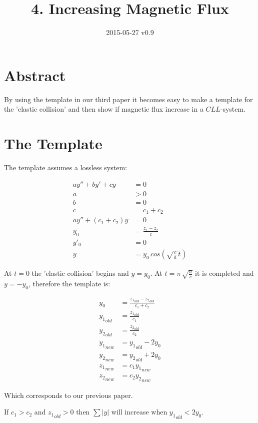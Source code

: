 \documentclass[]{../common/elementary-physics}
\title{4. Increasing Magnetic Flux}
\date{2015-05-27 v0.9}
\begin{document}
\maketitle

\tableofcontents

\section{Abstract}

By using the template in our third paper\cite{analogies} it becomes easy to make a template for the 'elastic collision' and then show if magnetic flux increase in a $CLL$-system.

\section{The Template}

The template assumes a lossless system:

\begin{align}
a y'' + b y' + c y &= 0 \\
a &> 0 \\
b &= 0 \\
c &= c_1 + c_2 \\
a y'' + (c_1 + c_2) y &= 0 \\
y_0 &= \frac{z_1-z_2}{c} \\
y'_0 &= 0 \\
y &= y_0 \, cos(\sqrt{\frac{c}{a} \, t})
\end{align}

At $t=0$ the 'elastic collision' begins and $y=y_0$.
At $t = \pi \, \sqrt{\frac{a}{c}}$ it is completed and $y = -y_0$, therefore the template is:

\begin{align}
y_0 &= \frac{{z_1}_{old}-{z_2}_{old}}{c_1 + c_2} \\
{y_1}_{old} &= \frac{{z_1}_{old}}{c_1} \\
{y_2}_{old} &= \frac{{z_2}_{old}}{c_2} \\
{y_1}_{new} &= {y_1}_{old} -2 y_0 \\
{y_2}_{new} &= {y_2}_{old} +2 y_0 \\
{z_1}_{new} &= c_1 {y_1}_{new} \\
{z_2}_{new} &= c_2 {y_2}_{new}
\end{align}

Which corresponds to our previous paper\cite{masspar}.

If $c_1 > c_2$ and ${z_1}_{old} > 0$ then $\sum |y|$ will increase when ${y_1}_{old} < 2 y_0$.
\end{document}

